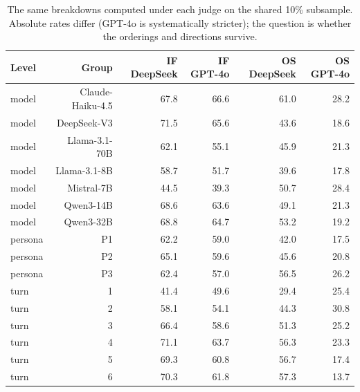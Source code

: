 \begin{table}[t]
\centering
\small
\caption{The same breakdowns computed under each judge on the shared 10\% subsample. Absolute rates differ (GPT-4o is systematically stricter); the question is whether the orderings and directions survive.}
\label{tab:judge_replication}
\begin{tabular}{lrrrrr}
\toprule
Level & Group & IF DeepSeek & IF GPT-4o & OS DeepSeek & OS GPT-4o \\
\midrule
model & Claude-Haiku-4.5 & 67.8 & 66.6 & 61.0 & 28.2 \\
model & DeepSeek-V3 & 71.5 & 65.6 & 43.6 & 18.6 \\
model & Llama-3.1-70B & 62.1 & 55.1 & 45.9 & 21.3 \\
model & Llama-3.1-8B & 58.7 & 51.7 & 39.6 & 17.8 \\
model & Mistral-7B & 44.5 & 39.3 & 50.7 & 28.4 \\
model & Qwen3-14B & 68.6 & 63.6 & 49.1 & 21.3 \\
model & Qwen3-32B & 68.8 & 64.7 & 53.2 & 19.2 \\
persona & P1 & 62.2 & 59.0 & 42.0 & 17.5 \\
persona & P2 & 65.1 & 59.6 & 45.6 & 20.8 \\
persona & P3 & 62.4 & 57.0 & 56.5 & 26.2 \\
turn & 1 & 41.4 & 49.6 & 29.4 & 25.4 \\
turn & 2 & 58.1 & 54.1 & 44.3 & 30.8 \\
turn & 3 & 66.4 & 58.6 & 51.3 & 25.2 \\
turn & 4 & 71.1 & 63.7 & 56.3 & 23.3 \\
turn & 5 & 69.3 & 60.8 & 56.7 & 17.4 \\
turn & 6 & 70.3 & 61.8 & 57.3 & 13.7 \\
\bottomrule
\end{tabular}
\end{table}
